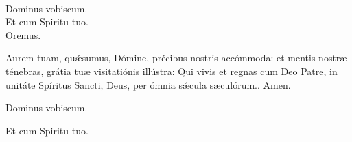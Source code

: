 \\
  \rubric{\Vbar}Dominus vobiscum.
\\
  \rubric{\Rbar}Et cum Spiritu tuo.
\\
Oremus.

Aurem tuam, quǽsumus, Dómine, précibus nostris accómmoda: et mentis nostræ ténebras, grátia tuæ visitatiónis illústra: Qui vivis et regnas cum Deo Patre, in unitáte Spíritus Sancti, Deus, per ómnia sǽcula sæculórum..\rubric{\Rbar} Amen.

  \rubric{\Vbar}Dominus vobiscum.

  \rubric{\Rbar}Et cum Spiritu tuo.

